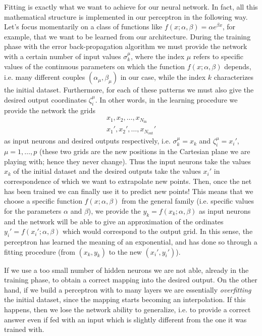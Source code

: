 Fitting is exactly what we want to achieve for our neural network. In fact, all this mathematical structure is implemented in our perceptron in the following way. Let's focus momentarily on a class of functions like $f(x;\alpha,\beta)=\alpha e^{\beta x}$, for example, that we want to be learned from our architecture. During the training phase with the error back-propagation algorithm we must provide the network with a certain number of input values $\sigma_k^\mu$, where the index $\mu$ refers to specific values of the continuous parameters on which the function $f(x;\alpha,\beta)$ depends, i.e. many different couples $(\alpha_\mu,\beta_\mu)$ in our case, while the index $k$ characterizes the initial dataset. Furthermore, for each of these patterns we must also give the desired output coordinates $\zeta_i^\mu$. In other words, in the learning procedure we provide the network the grids
\begin{gather}
x_1,x_2,\ldots,x_{N_{\text{in}}}\\
x_1',x_2',\ldots,x_{N_{\text{out}}}'
\end{gather}
as input neurons and desired outputs respectively, i.e. $\sigma_k^\mu=x_k$ and $\zeta_i^\mu=x_i'$, $\mu=1,\ldots,p$ (these two grids are the new positions in the Cartesian plane we are playing with; hence they never change). Thus the input neurons take the values $x_k$ of the initial dataset and the desired outputs take the values $x_i'$ in correspondence of which we want to extrapolate new points.
Then, once the net has been trained we can finally use it to predict new points! This means that we choose a specific function $f(x;\alpha,\beta)$ from the general family (i.e. specific values for the parameters $\alpha$ and $\beta$), we provide the $y_k=f(x_k;\alpha,\beta)$ as input neurons and the network will be able to give an approximation of the ordinates $y_i'=f(x_i';\alpha,\beta)$ which would correspond to the output grid. In this sense, the perceptron has learned the meaning of an exponential, and has done so through a fitting procedure (from $(x_k,y_k)$ to the new $(x_i',y_i')$).

If we use a too small number of hidden neurons we are not able, already in the training phase, to obtain a correct mapping into the desired output. On the other hand, if we build a perceptron with to many layers we are essentially \emph{overfitting} the initial dataset, since the mapping starts becoming an interpolation. If this happens, then we lose the network ability to generalize, i.e. to provide a correct answer even if fed with an input which is slightly different from the one it was trained with.

